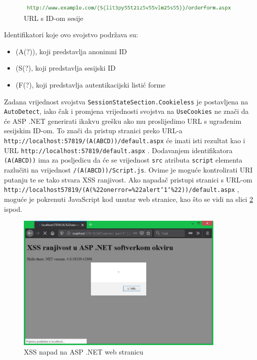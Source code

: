 \documentclass[12pt, oneside, onecolumn]{book}
\begin{document}
{\begin{figure}[H]
	\begin{center}
		\includegraphics[width=\textwidth]{asp_url.jpg}
		\caption{URL s ID-om sesije} \label{fig:asp_url}
	\end{center}
\end{figure}

Identifikatori koje ovo svojstvo podržava su:

\begin{itemize}
\item (A(?)), koji predstavlja anonimni ID
\item (S(?), koji predstavlja sesijski ID
\item (F(?), koji predstavlja autentikacijski listić forme
\end{itemize}

Zadana vrijednost svojstva \texttt{SessionStateSection.Cookieless} je postavljena na \texttt{AutoDetect}, iako čak i promjena vrijednosti svojstva na \texttt{UseCookies} ne znači da će ASP .NET generirati ikakvu grešku ako mu proslijedimo URL s ugrađenim sesijskim ID-om. To znači da pristup stranici preko URL-a \texttt{http://localhost:57819/(A(ABCD))/default.aspx} će imati isti rezultat kao i URL \texttt{http://localhost:57819/default.aspx} . Dodavanjem identifikatora \texttt{(A(ABCD))} ima za posljedicu da će se vrijednost \texttt{src} atributa \texttt{script} elementa razlučiti na vrijednost \texttt{/(A(ABCD))/Script.js}. Ovime je moguće kontrolirati URI putanju te se tako stvara XSS ranjivost. Ako napadač pristupi stranici s URL-om \texttt{http://localhost57819/(A(\%22onerror=\%22alert`1`\%22))/default.aspx} , moguće je pokrenuti JavaScript kod unutar web stranice, kao što se vidi na slici \ref{fig:asp_xss} ispod.

\begin{figure}[H]
	\begin{center}
		\includegraphics[width=0.9\textwidth]{asp_xss.jpg}
		\caption{XSS napad na ASP .NET web stranicu} \label{fig:asp_xss}
	\end{center}
\end{figure}

}
\end{document}
